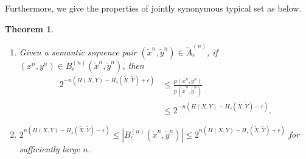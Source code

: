\documentclass[12pt, draftclsnofoot,onecolumn]{IEEEtran}
\newtheorem{theorem}{\bf{Theorem}}
\begin{document}
Furthermore, we give the properties of jointly synonymous typical set as below.
\begin{theorem}\label{SJTS_theorem}
\text{ }
\begin{enumerate}[(1)]
    \item Given a semantic sequence pair $\left(\tilde{x}^n,\tilde{y}^n\right)\in \tilde{A}_{\epsilon}^{(n)}$, if $\left(x^n, y^n\right)\in B_{\epsilon}^{(n)}\left(\tilde{x}^n,\tilde{y}^n\right)$, then
        \begin{equation}
        \begin{aligned}
        2^{-n\left(H(X,Y)-H_s(\tilde{X},\tilde{Y})+\epsilon\right)}&\leq \frac{p\left(x^n,y^n\right)}{p\left(\tilde{x}^n,\tilde{y}^n\right)}\\
         &\leq 2^{-n\left(H(X,Y)-H_s(\tilde{X},\tilde{Y})-\epsilon\right)}.
        \end{aligned}
        \end{equation}
    \item $ 2^{n\left(H(X,Y)-H_s(\tilde{X},\tilde{Y})-\epsilon\right)}\leq\left|B_{\epsilon}^{(n)}\left(\tilde{x}^n,\tilde{y}^n\right)\right| \leq 2^{n\left(H(X,Y)-H_s(\tilde{X},\tilde{Y})+\epsilon\right)}$ for sufficiently large $n$.
\end{enumerate}
\end{theorem}
\end{document}
